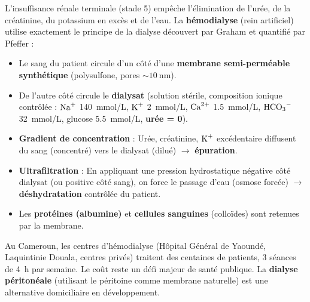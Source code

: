 \documentclass[11pt]{article}
\begin{document}
\begin{savaistu}
L'insuffisance rénale terminale (stade 5) empêche l'élimination de l'urée, de la créatinine, du potassium en excès et de l'eau. La \textbf{hémodialyse} (rein artificiel) utilise exactement le principe de la dialyse découvert par Graham et quantifié par Pfeffer :
\begin{itemize}
    \item Le sang du patient circule d'un côté d'une \textbf{membrane semi-perméable synthétique} (polysulfone, pores $\sim \SI{10}{\nano\meter}$).
    \item De l'autre côté circule le \textbf{dialysat} (solution stérile, composition ionique contrôlée : $\ce{Na+}$ \SI{140}{mmol/L}, $\ce{K+}$ \SI{2}{mmol/L}, $\ce{Ca^{2+}}$ \SI{1,5}{mmol/L}, $\ce{HCO3-}$ \SI{32}{mmol/L}, glucose \SI{5,5}{mmol/L}, \textbf{urée = 0}).
    \item \textbf{Gradient de concentration} : Urée, créatinine, $\ce{K+}$ excédentaire diffusent du sang (concentré) vers le dialysat (dilué) $\to$ \textbf{épuration}.
    \item \textbf{Ultrafiltration} : En appliquant une pression hydrostatique négative côté dialysat (ou positive côté sang), on force le passage d'eau (osmose forcée) $\to$ \textbf{déshydratation} contrôlée du patient.
    \item Les \textbf{protéines (albumine)} et \textbf{cellules sanguines} (colloïdes) sont retenues par la membrane.
\end{itemize}
Au Cameroun, les centres d'hémodialyse (Hôpital Général de Yaoundé, Laquintinie Douala, centres privés) traitent des centaines de patients, 3 séances de \SI{4}{\hour} par semaine. Le coût reste un défi majeur de santé publique. La \textbf{dialyse péritonéale} (utilisant le péritoine comme membrane naturelle) est une alternative domiciliaire en développement.
\end{savaistu}
\end{document}
